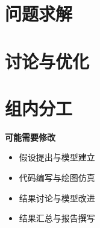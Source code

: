 \documentclass{article}
\begin{document}
	\section{问题求解}
	
	\section{讨论与优化}
	
	\section{组内分工}
	\textbf{可能需要修改}
	\begin{itemize}
		\item 假设提出与模型建立
		\item 代码编写与绘图仿真
		\item 结果讨论与模型改进
		\item 结果汇总与报告撰写
	\end{itemize}
	
%	
	
\end{document}
